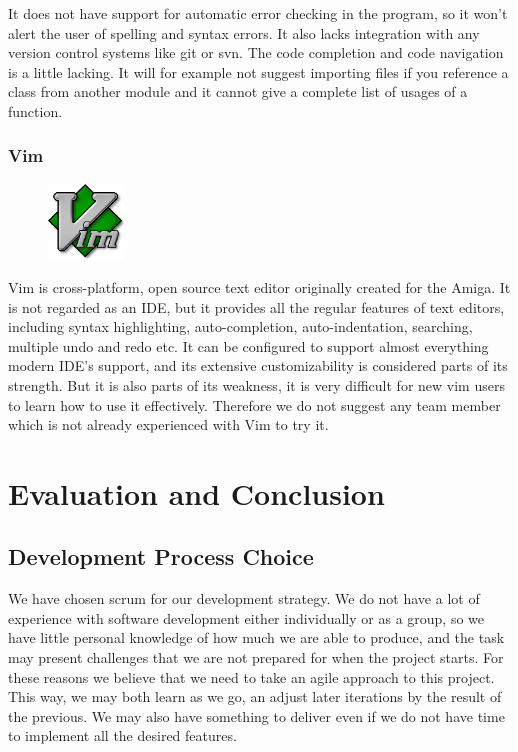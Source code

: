 It does not have support for automatic error checking in the program, so it
won’t alert the user of spelling and syntax errors. It also lacks integration
with any version control systems like git or svn. The code completion and
code navigation is a little lacking. It will for example not suggest importing
files if you reference a class from another module and it cannot give a
complete list of usages of a function.

\subsubsection{Vim}
\begin{figure}
	\begin{center}
	\vspace{-30pt}
		\includegraphics[width=2cm]{./planning/img/vim_logo}
	\vspace{-30pt}
	\end{center}
\end{figure}
Vim is cross-platform, open source text editor originally created for the
Amiga. It is not regarded as an IDE, but it provides all the regular features
of text editors, including syntax highlighting, auto-completion,
auto-indentation, searching, multiple undo and redo etc. It can be configured
to support almost everything modern IDE’s support, and its extensive
customizability is considered parts of its strength. But it is also parts of
its weakness, it is very difficult for new vim users to learn how to use it
effectively. Therefore we do not suggest any team member which is not already
experienced with Vim to try it.

\section{Evaluation and Conclusion}
\label{sec:pre:eval}

\subsection{Development Process Choice}
We have chosen scrum for our development strategy. We do not have a lot of
experience with software development either individually or as a group, so we
have little personal knowledge of how much we are able to produce, and the
task may present challenges that we are not prepared for when the project
starts. For these reasons we believe that we need to take an agile approach to
this project. This way, we may both learn as we go, an adjust later iterations
by the result of the previous. We may also have something to deliver even if we
do not have time to implement all the desired features.

